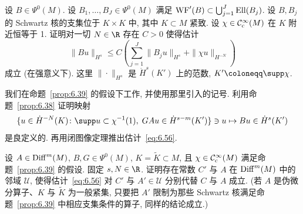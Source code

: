 \begin{exer}[另一个微局部椭圆正则性估计]\label{ex:6.12}
设 $B \in \Psi^0(M)$. 设 $B_1, \ldots, B_J \in \Psi^0(M)$ 满足 $\operatorname{WF}'(B) \subset \bigcup_{j=1}^J \operatorname{Ell}(B_j)$. 设 $B, B_j$ 的 Schwartz 核的支集位于 $K \times K$ 中, 其中 $K \subset M$ 紧致. 设 $\chi \in \mathcal{C}_{\mathrm{c}}^\infty(M)$ 在 $K$ 附近恒等于 1. 证明对一切 $N \in \R$ 存在 $C > 0$ 使得估计
\begin{equation}\label{eq:6.128}
    \|B u\|_{H^s} \le C \left( \sum_{j=1}^J \|B_j u\|_{H^s} + \|\chi u\|_{H^{-N}} \right)
\end{equation}
成立 (在强意义下). 这里 $\|\cdot\|_{H^s}$ 是 $\dot{H}^s(K')$ 上的范数, $K' \defeq \supp \chi$.
\end{exer}

\begin{exer}[定性与定量微局部椭圆正则性]\label{ex:6.13}
我们在命题~\ref{prop:6.39} 的假设下工作, 并使用那里引入的记号. 利用命题~\ref{prop:6.38} 证明映射
\begin{equation}\label{eq:6.129}
    \{u \in \dot{H}^{-N}(K) \colon \supp u \subset \chi^{-1}(1), \; G A u \in \dot{H}^{s-m}(K')\} \ni u \mapsto B u \in \dot{H}^s(K')
\end{equation}
是良定义的. 再用闭图像定理推出估计~\eqref{eq:6.56}.
\end{exer}

\begin{exer}[微局部椭圆估计的稳定性]\label{ex:6.14}
设 $A \in \operatorname{Diff}^m(M)$, $B, G \in \Psi^0(M)$, $K = \tilde{K} \subset M$, 且 $\chi \in \mathcal{C}_{\mathrm{c}}^\infty(M)$ 满足命题~\ref{prop:6.39} 的假设. 固定 $s, N \in \R$. 证明存在常数 $C'$ 与 $A$ 在 $\operatorname{Diff}^m(M)$ 中的邻域 $\mathcal{U}$, 使得估计~\eqref{eq:6.56} 对 $C'$ 与 $A' \in \mathcal{U}$ 分别代替 $C$ 与 $A$ 成立. (若 $A$ 是伪微分算子、$K$ 与 $\tilde{K}$ 为一般紧集, 只要把 $A'$ 限制为那些 Schwartz 核满足命题~\ref{prop:6.39} 中相应支集条件的算子, 同样的结论成立.)
\end{exer}

